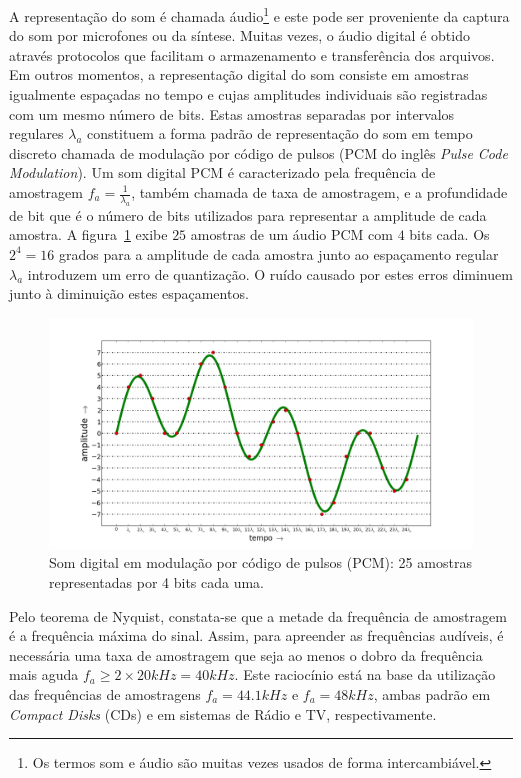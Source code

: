 A representação do som é chamada áudio\footnote{Os termos
som e áudio são muitas vezes usados de forma intercambiável.\cite{Everest}} e este pode ser proveniente da captura do som por microfones ou da síntese. Muitas vezes, o áudio digital é obtido através protocolos que facilitam o armazenamento e transferência dos arquivos.\cite{procFala} Em outros momentos, a representação digital do som consiste em amostras igualmente espaçadas no tempo e cujas amplitudes individuais são registradas com um mesmo número de bits. Estas amostras separadas por intervalos regulares $\lambda_a$ constituem a forma padrão de representação do som em tempo discreto chamada de modulação por código de pulsos (PCM do inglês \emph{Pulse Code Modulation}).
Um som digital PCM é caracterizado pela frequência de amostragem $f_a=\frac{1}{\lambda_a}$, também chamada de taxa de amostragem, e a profundidade de bit que é o número de bits utilizados para representar a amplitude de cada amostra.\cite{protocolosAudio} A figura~\ref{fig:PCM} exibe $25$ amostras de um áudio PCM com $4$ bits cada. Os $2^4=16$ grados para a amplitude de cada amostra junto ao espaçamento regular $\lambda_a$ introduzem um erro de quantização. O ruído causado por estes erros diminuem junto à diminuição estes espaçamentos. 


\begin{figure}[h!]
    \centering
        \includegraphics[width=\textwidth]{figuras/pcm}
    \caption{Som digital em modulação por código de pulsos (PCM): 25 amostras representadas por 4 bits cada uma.}
        \label{fig:PCM}
\end{figure}

Pelo teorema de Nyquist, constata-se que a metade da frequência de amostragem é a frequência máxima do sinal. Assim, para apreender as frequências audíveis, é necessária uma taxa de amostragem que seja ao menos o dobro da frequência mais aguda $f_a \geq 2\times 20kHz=40kHz$. Este raciocínio está na base da utilização das frequências de amostragens $f_a=44.1kHz$ e $f_a=48kHz$, ambas padrão em \emph{Compact Disks} (CDs) e em sistemas de Rádio e TV, respectivamente.\cite{protocolosAudio}


